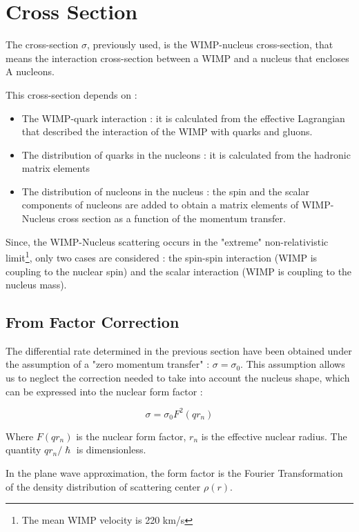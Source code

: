 \documentclass[a4paper, twoside, openany, 11pt]{book}
\begin{document}
\section{Cross Section}
\label{sec:crosssection}

The cross-section $\sigma$, previously used, is the WIMP-nucleus cross-section, that means the interaction cross-section between a WIMP and a nucleus that encloses A nucleons.

This cross-section depends on : 

\begin{itemize}
\item The WIMP-quark interaction : it is calculated from the effective Lagrangian that described the interaction of the WIMP with quarks and gluons.
\item The distribution of quarks in the nucleons : it is calculated from the hadronic matrix elements 
\item The distribution of nucleons in the nucleus  : the spin and the scalar components of nucleons are added to obtain a matrix elements of WIMP-Nucleus cross section as a function of the momentum transfer. 
\end{itemize}

Since, the WIMP-Nucleus scattering occurs in the "extreme" non-relativistic limit\footnote{The mean WIMP velocity is 220 km/s}, only two cases are considered : the spin-spin interaction (WIMP is coupling to the nuclear spin) and the scalar interaction (WIMP is coupling to the nucleus mass).


\subsection{From Factor Correction}
\label{subsec:FormFactor}

The differential rate determined in the previous section have been obtained under the assumption of a "zero momentum transfer" :  $ \sigma = \sigma_0$. This assumption allows us to neglect the correction needed to take into account the nucleus shape, which can be expressed into the nuclear form factor : 

\begin{equation}
\label{eq:cross_form_factor}
\sigma = \sigma_0 F^2(qr_n)
\end{equation}

Where $F(qr_n)$ is the nuclear form factor, $r_n$ is the effective nuclear radius.
The quantity $qr_n/\hslash$ is dimensionless. 

In the plane wave approximation, the form factor is the Fourier Transformation of the density distribution of scattering center $\rho (r)$. 
\end{document}
